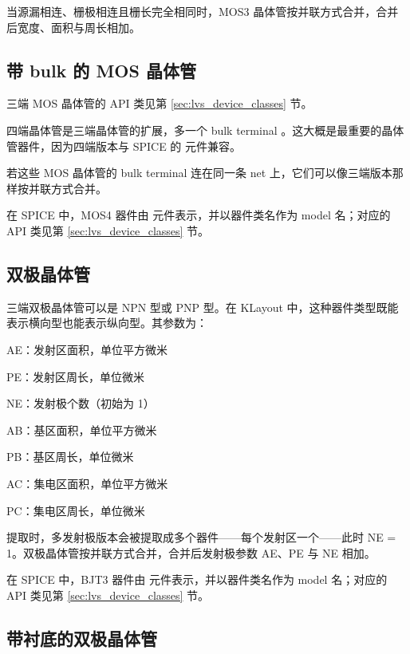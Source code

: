 当源漏相连、栅极相连且栅长完全相同时，MOS3 晶体管按并联方式合并，合并后宽度、面积与周长相加。

\subsection{带 bulk 的 MOS 晶体管}

三端 MOS 晶体管的 API 类见第 \ref{sec:lvs_device_classes} 节。


四端晶体管是三端晶体管的扩展，多一个 bulk terminal 。这大概是最重要的晶体管器件，因为四端版本与 SPICE 的  元件兼容。

若这些 MOS 晶体管的 bulk terminal 连在同一条 net 上，它们可以像三端版本那样按并联方式合并。

在 SPICE 中，MOS4 器件由  元件表示，并以器件类名作为 model 名；对应的 API 类见第 \ref{sec:lvs_device_classes} 节。

\subsection{双极晶体管}


三端双极晶体管可以是 NPN 型或 PNP 型。在 KLayout 中，这种器件类型既能表示横向型也能表示纵向型。其参数为：

\begin{kldesc}
\item AE：发射区面积，单位平方微米
\item PE：发射区周长，单位微米
\item NE：发射极个数（初始为 1）
\item AB：基区面积，单位平方微米
\item PB：基区周长，单位微米
\item AC：集电区面积，单位平方微米
\item PC：集电区周长，单位微米
\end{kldesc}

提取时，多发射极版本会被提取成多个器件——每个发射区一个——此时 NE = 1。双极晶体管按并联方式合并，合并后发射极参数 AE、PE 与 NE 相加。

在 SPICE 中，BJT3 器件由  元件表示，并以器件类名作为 model 名；对应的 API 类见第 \ref{sec:lvs_device_classes} 节。

\subsection{带衬底的双极晶体管}

